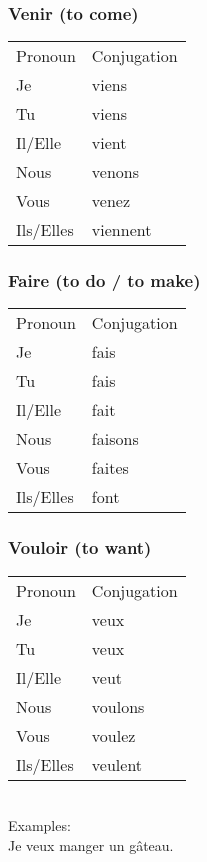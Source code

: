 \subsubsection{Venir (to come)}
\begin{tabular}{| l | l |}
\hline
Pronoun 	& 	Conjugation	\\
Je		    &	viens		\\
Tu		    &	viens		\\
Il/Elle		&	vient		\\
Nous		&	venons		\\
Vous		&	venez		\\
Ils/Elles	&	viennent		\\
\hline
\end{tabular}

\subsubsection{Faire (to do / to make)}
\begin{tabular}{| l | l |}
\hline
Pronoun 	& 	Conjugation	\\
Je		    &	fais		\\
Tu		    &	fais		\\
Il/Elle		&	fait		\\
Nous		&	faisons		\\
Vous		&	faites		\\
Ils/Elles	&	font		\\
\hline
\end{tabular}

\subsubsection{Vouloir (to want)}
\begin{tabular}{| l | l |}
\hline
Pronoun 	& 	Conjugation	\\
Je		    & veux        \\
Tu		    & veux        \\
Il/Elle		& veut        \\
Nous		& voulons     \\
Vous		& voulez      \\
Ils/Elles	& veulent     \\
\hline
\end{tabular}


\noindent \\Examples:\\
Je veux manger un g\^ateau.

